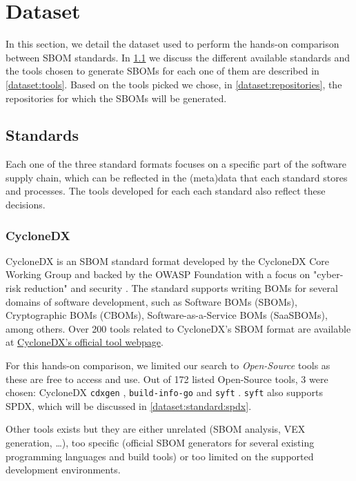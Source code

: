 \section{Dataset}

In this section, we detail the dataset used to perform the hands-on comparison between SBOM standards. In \ref{dataset:standards} we discuss the different available standards and the tools chosen to generate SBOMs for each one of them are described in \ref{dataset:tools}. Based on the tools picked we chose, in \ref{dataset:repositories}, the repositories for which the SBOMs will be generated.

\subsection{Standards} \label{dataset:standards}

Each one of the three standard formats focuses on a specific part of the software supply chain, which can be reflected in the (meta)data that each standard stores and processes. The tools developed for each each standard also reflect these decisions.

\subsubsection{CycloneDX} \label{dataset:standard:cdx}

CycloneDX \cite{standards:sbom:cyclonedx} is an SBOM standard format developed by the CycloneDX Core Working Group and backed by the OWASP Foundation with a focus on "cyber-risk reduction" \cite{standards:sbom:cyclonedx} and security \cite{article:sbom-study}. The standard supports writing BOMs for several domains of software development, such as Software BOMs (SBOMs), Cryptographic BOMs (CBOMs), Software-as-a-Service BOMs (SaaSBOMs), among others. Over 200 tools related to CycloneDX's SBOM format are available at \href{https://cyclonedx.org/tool-center/}{\underline{CycloneDX's official tool webpage}}.

For this hands-on comparison, we limited our search to \emph{Open-Source} tools as these are free to access and use. Out of 172 listed Open-Source tools, 3 were chosen: CycloneDX \verb|cdxgen| \cite{repository:cyclonedx:cdxgen}, \verb|build-info-go| \cite{repository:cyclonedx:build-info-go} and \verb|syft| \cite{repository:cyclonedx:syft}. \verb|syft| also supports SPDX, which will be discussed in \ref{dataset:standard:spdx}.

Other tools exists but they are either unrelated (SBOM analysis, VEX generation, \dots), too specific (official SBOM generators for several existing programming languages and build tools) or too limited on the supported development environments.

